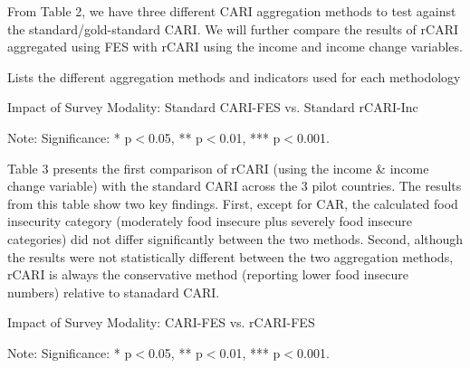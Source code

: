 \documentclass[11pt,harvard]{article}
\begin{document}
	From Table 2, we have three different CARI aggregation methods to test against the standard/gold-standard CARI. We will further compare the results of rCARI aggregated using FES with rCARI using the income and income change variables.
	
	\begin{table}[htbp]
		\centering
		\begin{adjustbox}{max width=\textwidth}
			\begin{threeparttable}
				\caption{Lists the different aggregation methods and indicators used for each methodology}
				\scriptsize
				 
				\label{tab:Aggregation_Table}
			\end{threeparttable}
		\end{adjustbox}
	\end{table}
	
	\begin{table}[htbp]
		\centering
		\begin{adjustbox}{max width=\textwidth}
			\begin{threeparttable}
				\caption{Impact of Survey Modality: Standard CARI-FES vs. Standard rCARI-Inc}
				\scriptsize
				 
				\label{tab:CARI_rCARI_Modality_All_Country}
				\begin{tablenotes}
					\item Note: Significance: * p$<$0.05, ** p$<$0.01, *** p$<$0.001. 
				\end{tablenotes}
			\end{threeparttable}
		\end{adjustbox}
	\end{table}
	
	Table 3 presents the first comparison of rCARI (using the income & income change variable) with the standard CARI across the 3 pilot countries. The results from this table show two key findings. First, except for CAR, the calculated food insecurity category (moderately food insecure plus severely food insecure categories) did not differ significantly between the two methods. Second, although the results were not statistically different between the two aggregation methods, rCARI is always the conservative method (reporting lower food insecure numbers) relative to stanadard CARI.
	
	\begin{table}[htbp]
		\centering
		\begin{adjustbox}{max width=\textwidth}
			\begin{threeparttable}
				\caption{Impact of Survey Modality: CARI-FES vs. rCARI-FES}
				\scriptsize
				 
				\label{tab:CARI_FES_rCARI_Modality_All_Country}
				\begin{tablenotes}
					\item Note: Significance: * p$<$0.05, ** p$<$0.01, *** p$<$0.001. 
				\end{tablenotes}
			\end{threeparttable}
		\end{adjustbox}
	\end{table}
	
\end{document}
